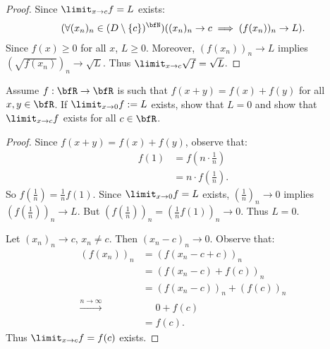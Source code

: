 \documentclass[11pt,twoside,openany]{memoir}
\begin{document}
        \begin{proof}
            Since $\limit_{x \rightarrow c}f = L$ exists:
                \begin{equation*}
                \begin{split}
                    (\forall (x_n)_n \in (D \setminus\{c\})^\bfN)((x_n)_n \rightarrow c \implies (f(x_n))_n \rightarrow L).
                \end{split}
                \end{equation*}
            Since $f(x) \geq 0$ for all $x$, $L \geq 0$. Moreover, $(f(x_n))_n \rightarrow L$ implies $\left(\sqrt{f(x_n)}\right)_n \rightarrow \sqrt{L}$. Thus $\limit_{x \rightarrow c}\sqrt{f} = \sqrt{L}$.
        \end{proof}
    \begin{exercise}
        Assume $f:\bfR \rightarrow \bfR$ is such that $f(x+y) = f(x) + f(y)$ for all $x,y \in \bfR$. If $\limit_{x \rightarrow 0}f := L$ exists, show that $L=0$ and show that $\limit_{x \rightarrow c}f$ exists for all $c \in \bfR$.
    \end{exercise}
        \begin{proof}
            Since $f(x+y) = f(x) + f(y)$, observe that:
                \begin{equation*}
                \begin{split}
                    f(1)
                    & = f\left(n \cdot \frac{1}{n}\right) \\
                    & = n\cdot f \left(\frac{1}{n}\right).
                \end{split}
                \end{equation*}
            So $f \left(\frac{1}{n}\right) = \frac{1}{n}f(1)$. Since $\limit_{x \rightarrow 0}f = L$ exists, $\left(\frac{1}{n}\right)_n \rightarrow 0$ implies $\left( f \left(\frac{1}{n}\right)\right)_n \rightarrow L$. But $\left(f \left(\frac{1}{n}\right)\right)_n = \left(\frac{1}{n}f(1)\right)_n \rightarrow 0$. Thus $L = 0$. \nl
            
            Let $(x_n)_n \rightarrow c$, $x_n \neq c$. Then $(x_n - c)_n \rightarrow 0$. Observe that:
                \begin{equation*}
                \begin{split}
                    (f(x_n))_n 
                    & = (f(x_n - c + c))_n \\
                    & = (f(x_n - c) + f(c))_n \\
                    & = (f(x_n -c))_n + (f(c))_n \\
                     \xrightarrow{n \rightarrow \infty} &\phantom{=} 0 + f(c) \\
                     & = f(c).
                \end{split}
                \end{equation*}
            Thus $\limit_{x \rightarrow c}f = f(c)$ exists.
        \end{proof}
\end{document}
